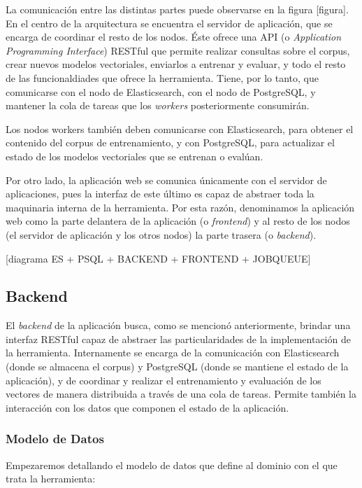 La comunicación entre las distintas partes puede observarse en la figura [figura]. En el centro de
la arquitectura se encuentra el servidor de aplicación, que se encarga de coordinar el resto de los
nodos. Éste ofrece una API (o \textit{Application Programming Interface}) RESTful que permite
realizar consultas sobre el corpus, crear nuevos modelos vectoriales, enviarlos a entrenar y
evaluar, y todo el resto de las funcionaldiades que ofrece la herramienta. Tiene, por lo tanto, que
comunicarse con el nodo de Elasticsearch, con el nodo de PostgreSQL, y mantener la cola de tareas
que los \textit{workers} posteriormente consumirán.

Los nodos workers también deben comunicarse con Elasticsearch, para obtener el contenido del
corpus de entrenamiento, y con PostgreSQL, para actualizar el estado de los modelos vectoriales que
se entrenan o evalúan.

Por otro lado, la aplicación web se comunica únicamente con el servidor de aplicaciones, pues la
interfaz de este último es capaz de abstraer toda la maquinaria interna de la herramienta. Por esta
razón, denominamos la aplicación web como la parte delantera de la aplicación (o \textit{frontend})
y al resto de los nodos (el servidor de aplicación y los otros nodos) la parte trasera (o
\textit{backend}).

[diagrama ES + PSQL + BACKEND + FRONTEND + JOBQUEUE]


\subsection{Backend}

El \textit{backend} de la aplicación busca, como se mencionó anteriormente, brindar una interfaz
RESTful capaz de abstraer las particularidades de la implementación de la herramienta. Internamente
se encarga de la comunicación con Elasticsearch (donde se almacena el corpus) y PostgreSQL (donde se
mantiene el estado de la aplicación), y de coordinar y realizar el entrenamiento y evaluación de los
vectores de manera distribuida a través de una cola de tareas. Permite también la interacción con
los datos que componen el estado de la aplicación.


\subsubsection{Modelo de Datos}

Empezaremos detallando el modelo de datos que define al dominio con el que trata la herramienta:

